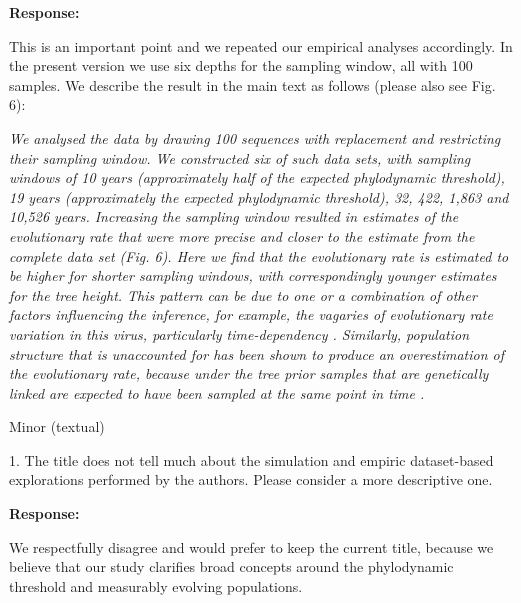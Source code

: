 \documentclass[11pt]{article}
\begin{document}
{\color{blue} \textbf{Response:}

This is an important point and we repeated our empirical analyses accordingly. In the present version we use six depths for the sampling window, all with 100 samples. We describe the result in the main text as follows (please also see Fig. 6):

\textit{We analysed the data by drawing 100 sequences with replacement and restricting their sampling window. We constructed six of such data sets, with sampling windows of 10 years (approximately half of the expected phylodynamic threshold), 19 years (approximately the expected phylodynamic threshold), 32, 422, 1,863 and 10,526 years. Increasing the sampling window resulted in estimates of the evolutionary rate that were more precise and closer to the estimate from the complete data set (Fig. 6). Here we find that the evolutionary rate is estimated to be higher for shorter sampling windows, with correspondingly younger estimates for the tree height. This pattern can be due to one or a combination of other factors influencing the inference, for example, the vagaries of evolutionary rate variation in this virus, particularly time-dependency \citep{vrancken2017accurate}. Similarly, population structure that is unaccounted for has been shown to produce an overestimation of the evolutionary rate, because under the tree prior samples that are genetically linked are expected to have been sampled at the same point in time \citep{moller2018impact}.}

}

Minor (textual)

1. The title does not tell much about the simulation and empiric dataset-based explorations performed by the authors. Please consider a more descriptive one.

{\color{blue} \textbf{Response:}

We respectfully disagree and would prefer to keep the current title, because we believe that our study clarifies broad concepts around the phylodynamic threshold and measurably evolving populations.
}
\end{document}
